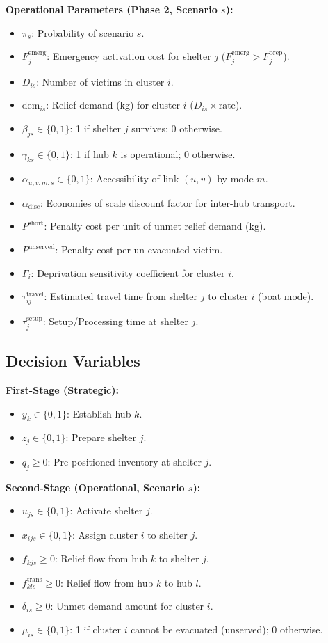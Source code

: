 \textbf{Operational Parameters (Phase 2, Scenario $s$):}
\begin{itemize}
    \item $\pi_s$: Probability of scenario $s$.
    \item $F_j^{\text{emerg}}$: Emergency activation cost for shelter $j$ ($F_j^{\text{emerg}} > F_j^{\text{prep}}$).
    \item $D_{is}$: Number of victims in cluster $i$.
    \item $\text{dem}_{is}$: Relief demand (kg) for cluster $i$ ($D_{is} \times \text{rate}$).
    \item $\beta_{js} \in \{0,1\}$: 1 if shelter $j$ survives; 0 otherwise.
    \item $\gamma_{ks} \in \{0,1\}$: 1 if hub $k$ is operational; 0 otherwise.
    \item $\alpha_{u,v,m,s} \in \{0,1\}$: Accessibility of link $(u,v)$ by mode $m$.
    \item $\alpha_{\text{disc}}$: Economies of scale discount factor for inter-hub transport.
    \item $P^{\text{short}}$: Penalty cost per unit of unmet relief demand (kg).
    \item $P^{\text{unserved}}$: Penalty cost per un-evacuated victim.
    \item $\Gamma_i$: Deprivation sensitivity coefficient for cluster $i$.
    \item $\tau_{ij}^{\text{travel}}$: Estimated travel time from shelter $j$ to cluster $i$ (boat mode).
    \item $\tau_{j}^{\text{setup}}$: Setup/Processing time at shelter $j$.
\end{itemize}

\subsection{Decision Variables}
\textbf{First-Stage (Strategic):}
\begin{itemize}
    \item $y_k \in \{0,1\}$: Establish hub $k$.
    \item $z_j \in \{0,1\}$: Prepare shelter $j$.
    \item $q_j \ge 0$: Pre-positioned inventory at shelter $j$.
\end{itemize}

\textbf{Second-Stage (Operational, Scenario $s$):}
\begin{itemize}
    \item $u_{js} \in \{0,1\}$: Activate shelter $j$.
    \item $x_{ijs} \in \{0,1\}$: Assign cluster $i$ to shelter $j$.
    \item $f_{kjs} \ge 0$: Relief flow from hub $k$ to shelter $j$.
    \item $f_{kls}^{\text{trans}} \ge 0$: Relief flow from hub $k$ to hub $l$.
    \item $\delta_{is} \ge 0$: Unmet demand amount for cluster $i$.
    \item $\mu_{is} \in \{0,1\}$: 1 if cluster $i$ cannot be evacuated (unserved); 0 otherwise.
\end{itemize}

